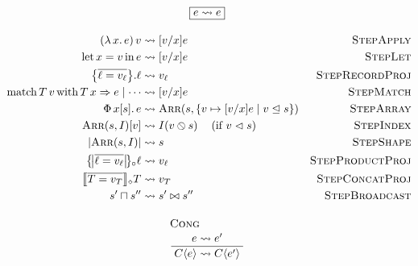 \begin{align*}
\multispan{3}{\hfil$\displaystyle \boxed{e \step e}$\hfil} \\[1em]
% 
% 
(\slam{x}{e})\,v 
&\leadsto [v/x]e 
& \textsc{StepApply} \\ 
% 
\slet{x}{v}{e} 
&\leadsto [v/x]e 
& \textsc{StepLet} \\ 
% 
\sproj{\srecordval{\overline{\ell = v_\ell}}}{\ell} &\leadsto v_\ell 
& \textsc{StepRecordProj} \\
% 
\smatch{\stag{T}{v}}{T\,x\Rightarrow e \mid \cdots} 
&\leadsto [v/x]e
& \textsc{StepMatch} \\
% 
\sbuild{x}{\vess}{e} 
&\leadsto \sarrayval{\vess}{\{ v \mapsto [v/x]e \mid v \inbsp \vess \}} 
& \textsc{StepArray} \\
% 
\sindex{\sarrayval{\vess}{I}}{v} 
&\leadsto I(\scast{v}{s})\;\;\
\text{ (if $v \inbs \vess$)}
& \textsc{StepIndex} \\
% 
\sshape{\sarrayval{\vess}{I}} 
&\leadsto \vess 
& \textsc{StepShape} \\
% 
\sproductproj{\sproductval{\overline{\ell= v_\ell}}}{\ell} 
&\leadsto v_\ell
& \textsc{StepProductProj} \\
% 
\sconcatproj{\sconcatval{\overline{T = v_T}}}{T} 
&\leadsto v_T 
& \textsc{StepConcatProj} \\
% 
\vess' \broadcast \vess'' 
&\leadsto \vess' \broadcastsem \vess'' 
& \textsc{StepBroadcast} 
\\[0.5em]
% 
% 
\multispan{3}{\hfil$\displaystyle \irule{Cong}{e \leadsto e'}{\evalct{C}{e} \leadsto \evalct{C}{e'}}$\hfil}
\end{align*} 
